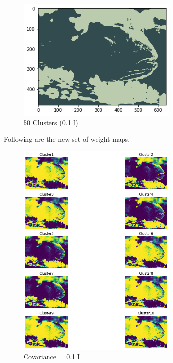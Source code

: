 \documentclass{article}      %
\begin{document}
    
\begin{figure}[H]
\centering
\includegraphics[width=0.7\textwidth]{fish_partc_means_50}
\caption{50 Clusters (0.1 I)}
\end{figure}


Following are the new set of weight maps.

\begin{figure}[H]
\centering
\includegraphics[width=0.7\textwidth]{fish_wts_partc_10}
\caption{Covariance = 0.1 I}
\end{figure}
\end{document}
